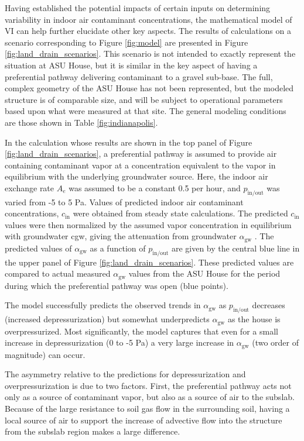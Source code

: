 \documentclass[journal=esthag,manuscript=article]{achemso}
\begin{document}
Having established the potential impacts of certain inputs on determining variability in indoor air contaminant concentrations, the mathematical model of VI can help further elucidate other key aspects.
The results of calculations on a scenario corresponding to Figure \ref{fig:model} are presented in Figure \ref{fig:land_drain_scenarios}.
This scenario is not intended to exactly represent the situation at ASU House, but it is similar in the key aspect of having a preferential pathway delivering contaminant to a gravel sub-base.
The full, complex geometry of the ASU House has not been represented, but the modeled structure is of comparable size, and will be subject to operational parameters based upon what were measured at that site.
The general modeling conditions are those shown in Table \ref{fig:indianapolis}.\par

In the calculation whose results are shown in the top panel of Figure \ref{fig:land_drain_scenarios}, a preferential pathway is assumed to provide air containing contaminant vapor at a concentration equivalent to the vapor in equilibrium with the underlying groundwater source.
Here, the indoor air exchange rate $A_e$ was assumed to be a constant 0.5 per hour, and $p_\mathrm{in/out}$ was varied from -5 to 5 Pa.
Values of predicted indoor air contaminant concentrations, $c_\mathrm{in}$ were obtained from steady state calculations. The predicted $c_\mathrm{in}$ values were then normalized by the assumed vapor concentration in equilibrium with groundwater  cgw, giving the attenuation from groundwater $\alpha_\mathrm{gw}$ .
The predicted values of $\alpha_\mathrm{gw}$ as a function of $p_\mathrm{in/out}$ are given by the central blue line in the upper panel of Figure \ref{fig:land_drain_scenarios}.
These predicted values are compared to actual measured $\alpha_\mathrm{gw}$ values from the ASU House for the period during which the preferential pathway was open (blue points).\par

The model successfully predicts the observed trends in $\alpha_\mathrm{gw}$ as $p_\mathrm{in/out}$ decreases (increased depressurization) but somewhat underpredicts $\alpha_\mathrm{gw}$ as the house is overpressurized.
Most significantly, the model captures that even for a small increase in depressurization (0 to -5 Pa) a very large increase in $\alpha_\mathrm{gw}$ (two order of magnitude) can occur.\par

The asymmetry relative to the predictions for depressurization and overpressurization is due to two factors.
First, the preferential pathway acts not only as a source of contaminant vapor, but also  as a source of air to the subslab.
Because of the large resistance to soil gas flow in the surrounding soil, having a local source of air to support the increase of advective flow into the structure from the subslab region makes a large difference.\par
\end{document}
